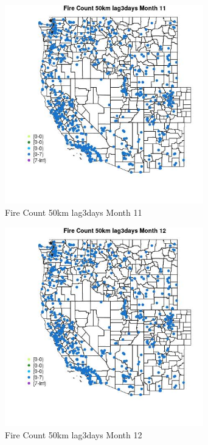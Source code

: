 \begin{figure} 
\centering  
\includegraphics[width=0.77\textwidth]{Code_Outputs/Report_ML_input_PM25_Step4_part_e_de_duplicated_aves_compiled_2019-05-21wNAs_MapObsMo11Fire_Count_50km_lag3days.jpg} 
\caption{\label{fig:Report_ML_input_PM25_Step4_part_e_de_duplicated_aves_compiled_2019-05-21wNAsMapObsMo11Fire_Count_50km_lag3days}Fire Count 50km lag3days Month 11} 
\end{figure} 
 

\clearpage 

\begin{figure} 
\centering  
\includegraphics[width=0.77\textwidth]{Code_Outputs/Report_ML_input_PM25_Step4_part_e_de_duplicated_aves_compiled_2019-05-21wNAs_MapObsMo12Fire_Count_50km_lag3days.jpg} 
\caption{\label{fig:Report_ML_input_PM25_Step4_part_e_de_duplicated_aves_compiled_2019-05-21wNAsMapObsMo12Fire_Count_50km_lag3days}Fire Count 50km lag3days Month 12} 
\end{figure} 
 

